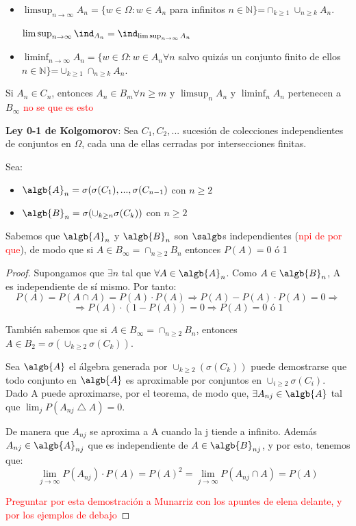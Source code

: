 \documentclass{apuntes}
\begin{document}
\begin{defn}
\begin{itemize}
\item $\limsup_{n \rightarrow \infty}A_n= \{w \in \Omega: w \in A_n$ para infinitos $n \in \mathbb{N} \}$=$\cap_{k \geq 1}\cup_{n\geq k} A_n$.

\obs $\limsup_{n \rightarrow \infty} \ind_{A_n}=\ind_{\limsup_{n \rightarrow \infty} A_n}$

\item $\liminf_{n \rightarrow \infty}A_n= \{w \in \Omega: w \in A_n \forall n$ salvo quizás un conjunto finito de ellos $n \in \mathbb{N} \}$=$\cup_{k \geq 1}\cap_{n\geq k} A_n$.
\end{itemize}
\end{defn}

\begin{example}
Si $A_n \in C_n$, entonces $A_n \in B_m \forall n\geq m$ y $\limsup_n A_n$ y $\liminf_n A_n$ pertenecen a $B_{\infty}$ \textcolor{red}{no se que es esto}
\end{example}

\textbf{Ley 0-1 de Kolgomorov}: Sea $C_1, C_2,...$ sucesión de colecciones independientes de conjuntos en $\Omega$, cada una de ellas cerradas por intersecciones finitas.

Sea:
\begin{itemize}
\item $\algb{A}_n=\sigma(\sigma(C_1),...,\sigma(C_{n-1})$ con $n\geq 2$
\item $\algb{B}_n=\sigma(\cup_{k\geq n} \sigma(C_k))$ con $n\geq 2$
\end{itemize} 

Sabemos que $\algb{A}_n$ y $\algb{B}_n$ son $\salgb$s independientes (\textcolor{red}{npi de por que}), de modo que si $A \in B_{\infty}=\cap_{n \geq 2} B_n$ entonces $P(A)=0$ ó 1
\begin{proof}
Supongamos que $\exists n$ tal que $\forall A \in \algb{A}_n$.  Como $A \in \algb{B}_n$, A es independiente de sí mismo. Por tanto:
\[
P(A)=P(A\cap A)=P(A)\cdot P(A) \Rightarrow P(A)-P(A)\cdot P(A)=0 \Rightarrow
\]
\[
\Rightarrow P(A)\cdot(1-P(A))=0 \Rightarrow P(A)=0 \text{ ó } 1
\]

También sabemos que si $A \in B_{\infty}=\cap_{n\geq2}B_n$, entonces $A \in B_2 = \sigma(\cup_{k\geq 2}\sigma(C_k))$.

Sea $\algb{A}$ el álgebra generada por $\cup_{k\geq 2}(\sigma(C_k))$ puede demostrarse que todo conjunto en $\algb{A}$ es aproximable por conjuntos en $\cup_{i\geq 2} \sigma(C_i)$. Dado A puede aproximarse, por el teorema, de modo que, $\exists A_{nj} \in \algb{A}$ tal que $\lim_j P(A_{nj}\bigtriangleup A)=0$.

De manera que $A_{nj}$ se aproxima a A cuando la j tiende a infinito. Además $A_{nj}\in \algb{A}_{nj}$ que es independiente de $A \in \algb{B}_{nj}$, y por esto, tenemos que:
\[
\lim_{j \rightarrow \infty}P(A_{nj})\cdot P(A)=P(A)^2= \lim_{j \rightarrow \infty}P(A_{nj} \cap A)=P(A)
\]

\textcolor{red}{Preguntar por esta demostración a Munarriz con los apuntes de elena delante, y por los ejemplos de debajo}
\end{proof}
\end{document}
